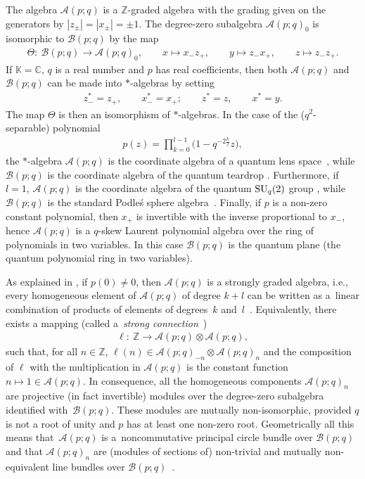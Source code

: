 \documentclass[10pt,a4paper]{amsart}
\numberwithin{equation}{section}
\def\Weyl#1#2{{\mathcal{B}}(#1;#2)}
\def\AWeyl#1#2{{\mathcal{A}}(#1;#2)}
\begin{document}
The algebra $\AWeyl p q$ is a ${\mathbb Z}$-graded algebra with the grading given on the generators by $|z_\pm | =|x_\pm| = \pm 1$. The degree-zero subalgebra ${\AWeyl p q}_0$ is isomorphic to $\Weyl p q$ by the map
\begin{gather}\label{theta}
\Theta\colon \ \Weyl p q \to {\AWeyl p q}_0, \qquad x\mapsto x_-z_+, \qquad y\mapsto z_-x_+, \qquad z\mapsto z_-z_+.
\end{gather}
If ${\mathbb K} ={\mathbb C}$, $q$ is a real number and $p$ has real coef\/f\/icients, then both $\AWeyl p q$ and $\Weyl p q$ can be made into $*$-algebras by setting
\begin{gather}\label{star}
z_-^* = z_+, \qquad x_-^* = x_+; \qquad z^*=z, \qquad x^* =y.
\end{gather}
The map $\Theta$ is then an isomorphism of $*$-algebras. In the case of the ($q^2$-separable) polynomial
\begin{gather*}
p(z) = \prod_{k=0}^{l-1}\big(1- q^{-2\frac{k}l}z\big),
\end{gather*}
the $*$-algebra $\AWeyl p q$ is the coordinate algebra of a quantum lens space~\cite{HonSzy:len}, while $\Weyl p q$ is the coordinate algebra of the quantum teardrop \cite{BrzFai:tea}. Furthermore, if $l=1$, $\AWeyl p q$ is the coordinate algebra of the quantum ${\rm SU}_q(2)$ group \cite{Wor:com}, while $\Weyl p q$ is the standard Podle\'s sphere algebra~\cite{Pod:sph}. Finally, if $p$ is a non-zero constant polynomial, then $x_+$ is invertible with the inverse proportional to $x_-$, hence $\AWeyl p q$ is a $q$-skew Laurent polynomial algebra over the ring of polynomials in two variables. In this case $\Weyl p q$ is the quantum plane (the quantum polynomial ring in two variables).

As explained in \cite[Theorem~3.7]{Brz:gen}, if $p(0)\neq 0$, then $\AWeyl p q$ is a strongly graded algebra, i.e., every homogeneous element of $\AWeyl p q$ of degree $k+l$ can be written as a~linear combination of products of elements of degrees~$k$ and~$l$~\cite{Dad:gro,NasVan:gra}. Equivalently, there exists a mapping (called a~{\em strong connection}~\cite{Haj:str})
\begin{gather*}
\ell \colon \ {\mathbb Z} \to \AWeyl p q \otimes \AWeyl p q,
\end{gather*}
such that, for all $n\in {\mathbb Z}$, $\ell(n) \in \AWeyl p q_{-n} \otimes \AWeyl p q_n$ and the composition of $\ell$ with the multiplication in $\AWeyl p q$ is the constant function $n\mapsto 1 \in \AWeyl p q$. In consequence, all the homogeneous components $\AWeyl p q_{n}$ are projective (in fact invertible) modules over the degree-zero subalgebra identif\/ied with~$\Weyl p q$. These modules are mutually non-isomorphic, provided $q$ is not a root of unity and $p$ has at least one non-zero root. Geometrically all this means that~$\AWeyl p q$ is a~noncommutative principal circle bundle over $\Weyl p q$ and that $\AWeyl p q_{n}$ are (modules of sections of) non-trivial and mutually non-equivalent line bundles over $\Weyl p q$~\cite{BrzMaj:gau}.
\end{document}
